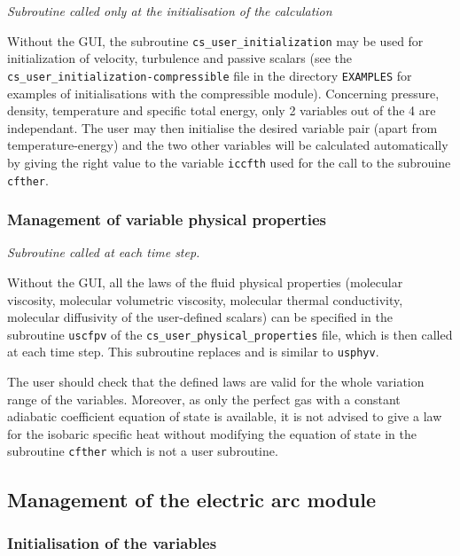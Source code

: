 {{\noindent
\textit{Subroutine called only at the initialisation of the calculation}

Without the GUI, the subroutine \texttt{cs\_user\_initialization} may be used for
 initialization of velocity, turbulence and passive scalars (see 
the \texttt{cs\_user\_initialization-compressible} file in the directory \texttt{EXAMPLES} 
for examples of initialisations with the compressible module). Concerning
pressure, density, temperature and specific total energy, only 2 variables out
of the 4 are independant. The user may then initialise the desired variable pair
(apart from temperature-energy) and the two other variables will be
calculated automatically by giving the right value to the variable
\texttt{iccfth} used for the call to the subrouine \texttt{cfther}.

\subsubsection{Management of variable physical properties}

\noindent
\textit{Subroutine called at each time step.}

Without the GUI, all the laws of the fluid physical properties
(molecular viscosity, molecular volumetric viscosity, molecular thermal conductivity, 
molecular diffusivity of the user-defined scalars) can be specified in the subroutine \texttt{uscfpv} of 
the \texttt{cs\_user\_physical\_properties} file,
 which is then called at each time step. This subroutine replaces and is similar to \texttt{usphyv}.

The user should check that the defined laws are valid for
the whole variation range of the variables. Moreover, as only the perfect gas with a constant 
adiabatic coefficient equation of state is available, it is not advised to give a law for the isobaric 
specific heat without modifying the equation of state in the subroutine \texttt{cfther} which is not
a user subroutine.

\subsection{Management of the electric arc module}
\subsubsection{Initialisation of the variables}

}}
